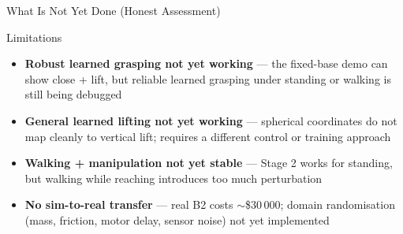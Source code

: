 \documentclass[10pt,aspectratio=169]{beamer}
\begin{document}
\begin{frame}{What Is Not Yet Done (Honest Assessment)}
  \begin{alertblock}{Limitations}
    \begin{itemize}
      \item \textbf{Robust learned grasping not yet working} ---
            the fixed-base demo can show close + lift, but reliable learned grasping
            under standing or walking is still being debugged

      \item \textbf{General learned lifting not yet working} ---
            spherical coordinates do not map cleanly to vertical lift;
            requires a different control or training approach

      \item \textbf{Walking + manipulation not yet stable} ---
            Stage 2 works for standing, but walking while reaching
            introduces too much perturbation

      \item \textbf{No sim-to-real transfer} ---
            real B2 costs $\sim$\$30\,000; domain randomisation
            (mass, friction, motor delay, sensor noise)
            not yet implemented
    \end{itemize}
  \end{alertblock}
\end{frame}
\end{document}
